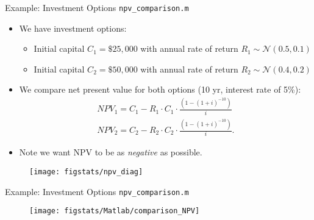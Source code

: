 \documentclass[9pt]{beamer}
\begin{document}
%
\begin{frame}{Example: Investment Options \footnotesize{\texttt{npv\_comparison.m}}}
\begin{itemize}
\item We have investment options:
\begin{itemize}
\item Initial capital $C_1=\$25,000$ with annual rate of return $R_1\sim \mathcal{N}(0.5,0.1)$
\item Initial capital $C_2=\$50,000$ with annual rate of return $R_2\sim \mathcal{N}(0.4,0.2)$
\end{itemize}
\item We compare net present value for both options (10 yr, interest rate of 5\%):
\begin{align*}
NPV_1=C_1 - R_1\cdot C_1\cdot \frac{(1-(1+i)^{-10})}{i}\\
NPV_2=C_2 - R_2\cdot C_2\cdot \frac{(1-(1+i)^{-10})}{i}.
\end{align*}
\item Note we want NPV to be as {\em negative} as possible. 
\end{itemize}

\begin{figure}[!htb]
    \centering
	\texttt{[image: figstats/npv\_diag]}
\end{figure}

\end{frame}

%
\begin{frame}{Example: Investment Options \footnotesize{\texttt{npv\_comparison.m}}}

\begin{figure}[!htb]
    \centering
	\texttt{[image: figstats/Matlab/comparison\_NPV]}
\end{figure}

\end{frame}
\end{document}
